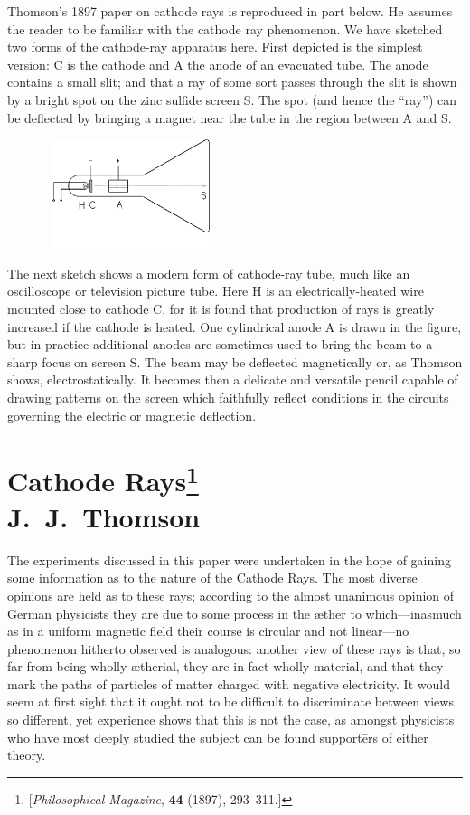 Thomson's
1897 paper on cathode rays is reproduced in part below. He assumes the
reader to be familiar with the cathode ray phenomenon. We have sketched
two forms of the cathode-ray apparatus here. First depicted is the
simplest version: C is the cathode and A the anode of an evacuated tube.
The anode contains a small slit; and that a ray of some sort passes
through the slit is shown by a bright spot on the zinc sulfide screen S.
The spot (and hence the ``ray'') can be deflected by bringing a magnet
near the tube in the region between A and S.


\begin{figure}
  \begin{center}
    \includegraphics[width=2in,height=1.25in]{images/02_thomson/image005.png} 
  \end{center}
\end{figure}
The next sketch shows a modern form of cathode-ray tube, much like an
oscilloscope or television picture tube. Here H is an
electrically-heated wire mounted close to cathode C, for it is found
that production of rays is greatly increased if the cathode is heated.
One cylindrical anode A is drawn in the figure, but in practice
additional anodes are sometimes used to bring the beam to a sharp focus
on screen S. The beam may be deflected magnetically or, as Thomson
shows, electrostatically. It becomes then a delicate and versatile
pencil capable of drawing patterns on the screen which faithfully
reflect conditions in the circuits governing the electric or magnetic
deflection.


\section*{Cathode Rays\footnote{{[}\emph{Philosophical Magazine}, \textbf{44}
 (1897), 293--311.{]}}\\ {\large J.\ J.\ Thomson}}


The experiments discussed in this paper were undertaken in the hope of
gaining some information as to the nature of the Cathode Rays. The most
diverse opinions are held as to these rays; according to the almost
unanimous opinion of German physicists they are due to some process in
the æther to which---inasmuch as in a uniform magnetic field their
course is circular and not linear---no phenomenon hitherto observed is
analogous: another view of these rays is that, so far from being wholly
ætherial, they are in fact wholly material, and that they mark the paths
of particles of matter charged with negative electricity. It would seem
at first sight that it ought not to be difficult to discriminate between
views so different, yet experience shows that this is not the case, as
amongst physicists who have most deeply studied the subject can be found
sup\-port\=ers of either theory.

